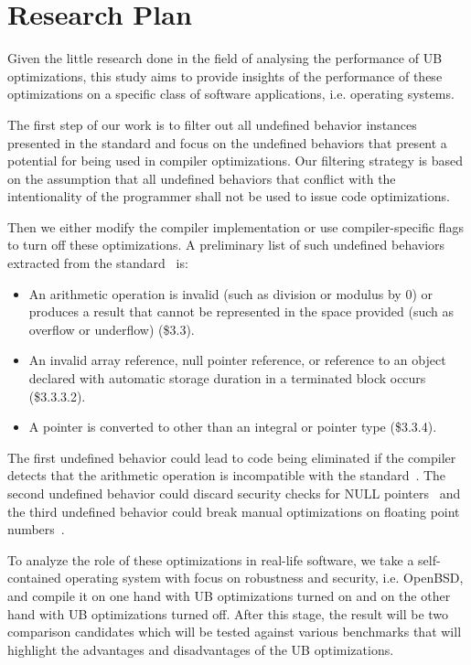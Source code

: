\section{Research Plan} \label{sec:rp}

Given the little research done in the field of analysing the performance
of UB optimizations, this study aims to provide insights of the
performance of these optimizations on a specific class of software
applications, i.e. operating systems.

The first step of our work is to filter out all undefined behavior
instances presented in the standard and focus on the undefined behaviors
that present a potential for being used in compiler optimizations. Our
filtering strategy is based on the assumption that all undefined
behaviors that conflict with the intentionality of the programmer shall
not be used to issue code optimizations.

Then we either modify the compiler implementation or use
compiler-specific flags to turn off these optimizations. A preliminary
list of such undefined behaviors extracted from the
standard~\cite{iso90} is:
\begin{itemize}
\item An arithmetic operation is invalid (such as division or modulus by
0) or produces a result that cannot be represented in the space provided
(such as overflow or underflow) (\$3.3).
\item An invalid array reference, null pointer reference, or reference
to an object declared with automatic storage duration in a terminated
block occurs (\$3.3.3.2).
\item A pointer is converted to other than an integral or pointer type
(\$3.3.4).  
\end{itemize}

The first undefined behavior could lead to code being eliminated if the
compiler detects that the arithmetic operation is incompatible with the
standard~\cite{wang2012undefined}. The second undefined behavior could
discard security checks for NULL pointers~\cite{fnodeletelinux} and the
third undefined behavior could break manual optimizations on floating
point numbers~\cite{lomont2003fast}.

To analyze the role of these optimizations in real-life software, we
take a self-contained operating system with focus on robustness and
security, i.e. OpenBSD, and compile it on one hand with UB optimizations
turned on and on the other hand with UB optimizations turned off. After
this stage, the result will be two comparison candidates which will be
tested against various benchmarks that will highlight the advantages and
disadvantages of the UB optimizations.

